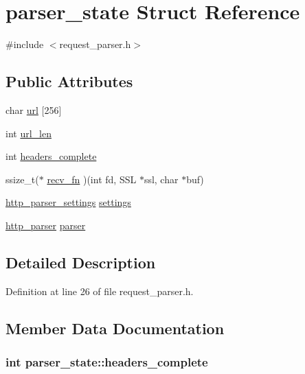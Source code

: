 \hypertarget{structparser__state}{\section{parser\-\_\-state Struct Reference}
\label{structparser__state}
}


{\ttfamily \#include $<$request\-\_\-parser.\-h$>$}

\subsection*{Public Attributes}
\begin{DoxyCompactItemize}
\item 
char \hyperlink{structparser__state_a64222808a9174a17ae2d25cb7ab72383}{url} \mbox{[}256\mbox{]}
\item 
int \hyperlink{structparser__state_a3ece333d4625d8c6a5f696a738b2fc41}{url\-\_\-len}
\item 
int \hyperlink{structparser__state_ae9786e3f8c7bc787516749856ad0cc42}{headers\-\_\-complete}
\item 
ssize\-\_\-t($\ast$ \hyperlink{structparser__state_ad02c5f0bb7a54a5be951120be343e767}{recv\-\_\-fn} )(int fd, S\-S\-L $\ast$ssl, char $\ast$buf)
\item 
\hyperlink{structhttp__parser__settings}{http\-\_\-parser\-\_\-settings} \hyperlink{structparser__state_a88886f7995880a05fd64c6ce943c4d2b}{settings}
\item 
\hyperlink{structhttp__parser}{http\-\_\-parser} \hyperlink{structparser__state_aaf6745c9db055761cd8da5f0d5e76d04}{parser}
\end{DoxyCompactItemize}


\subsection{Detailed Description}


Definition at line 26 of file request\-\_\-parser.\-h.



\subsection{Member Data Documentation}
\hypertarget{structparser__state_ae9786e3f8c7bc787516749856ad0cc42}{
\subsubsection[{headers\-\_\-complete}]{\setlength{\rightskip}{0pt plus 5cm}int parser\-\_\-state\-::headers\-\_\-complete}}\label{structparser__state_ae9786e3f8c7bc787516749856ad0cc42}



